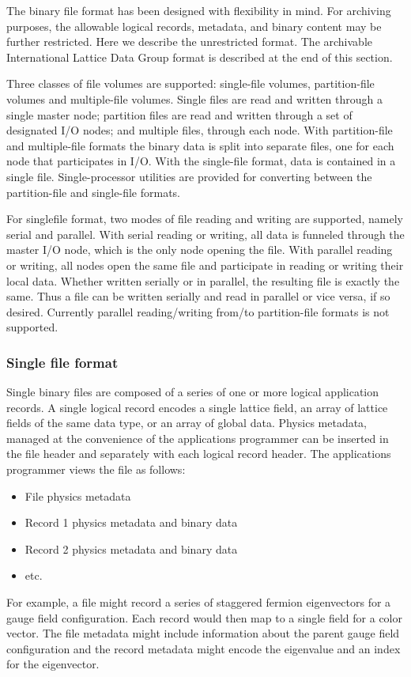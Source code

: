 \documentclass{article}
\begin{document}
The binary file format has been designed with flexibility in mind. For
archiving purposes, the allowable logical records, metadata, and
binary content may be further restricted.  Here we describe the
unrestricted format.  The archivable International Lattice Data Group
format is described at the end of this section.

Three classes of file volumes are supported: single-file volumes,
partition-file volumes and multiple-file volumes.  Single files are
read and written through a single master node; partition files are
read and written through a set of designated I/O nodes; and multiple
files, through each node.  With partition-file and multiple-file
formats the binary data is split into separate files, one for each
node that participates in I/O.  With the single-file format, data is
contained in a single file.  Single-processor utilities are provided
for converting between the partition-file and single-file formats.

For singlefile format, two modes of file reading and writing are
supported, namely serial and parallel.  With serial reading or
writing, all data is funneled through the master I/O node, which is
the only node opening the file.  With parallel reading or writing, all
nodes open the same file and participate in reading or writing their
local data.  Whether written serially or in parallel, the resulting
file is exactly the same.  Thus a file can be written serially and
read in parallel or vice versa, if so desired.  Currently parallel
reading/writing from/to partition-file formats is not supported.

\subsubsection{Single file format}

Single binary files are composed of a series of one or more logical
application records.  A single logical record encodes a single lattice
field, an array of lattice fields of the same data type, or an array
of global data.  Physics metadata, managed at the convenience of the
applications programmer can be inserted in the file header and
separately with each logical record header. The applications
programmer views the file as follows:
%
\begin{itemize}
  \item File physics metadata
  \item Record 1 physics metadata and binary data
  \item Record 2 physics metadata and binary data
  \item etc.
\end{itemize}
%
For example, a file might record a series of staggered fermion
eigenvectors for a gauge field configuration.  Each record would then
map to a single field for a color vector.  The file metadata might
include information about the parent gauge field configuration and the
record metadata might encode the eigenvalue and an index for the
eigenvector.
\end{document}
